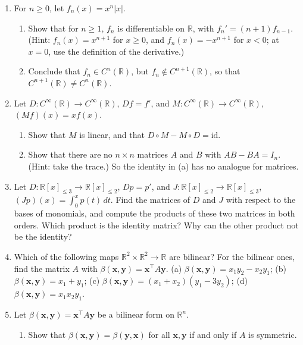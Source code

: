 \begin{enumerate}[leftmargin=*]
	\item\label{L1-ex:Cn-strict} \homework{} For $n \geq 0$, let $f_n(x) = x^n|x|$.
	\begin{enumerate}
		\item Show that for $n \geq 1$, $f_n$ is differentiable on $\mathbb{R}$, with $f_n' = (n + 1)f_{n-1}$. (Hint: $f_n(x) = x^{n+1}$ for $x \geq 0$, and $f_n(x) = -x^{n+1}$ for $x < 0$; at $x = 0$, use the definition of the derivative.)
		\item Conclude that $f_n \in C^n(\mathbb{R})$, but $f_n \notin C^{n+1}(\mathbb{R})$, so that $C^{n+1}(\mathbb{R}) \neq C^n(\mathbb{R})$.
	\end{enumerate}
	\item \homework{} Let $D: C^\infty(\mathbb{R}) \to C^\infty(\mathbb{R})$, $Df = f'$, and $M: C^\infty(\mathbb{R}) \to C^\infty(\mathbb{R})$, $(Mf)(x) = x f(x)$.
	\begin{enumerate}
		\item Show that $M$ is linear, and that $D \circ M - M \circ D = \mathrm{id}$.
		\item Show that there are no $n \times n$ matrices $A$ and $B$ with $AB - BA = I_n$. (Hint: take the trace.) So the identity in (a) has no analogue for matrices.
	\end{enumerate}
	\item \homework{} Let $D: \mathbb{R}[x]_{\leq 3} \to \mathbb{R}[x]_{\leq 2}$, $Dp = p'$, and $J: \mathbb{R}[x]_{\leq 2} \to \mathbb{R}[x]_{\leq 3}$, $(Jp)(x) = \int_0^x p(t)\, dt$. Find the matrices of $D$ and $J$ with respect to the bases of monomials, and compute the products of these two matrices in both orders. Which product is the identity matrix? Why can the other product not be the identity?
	\item Which of the following maps $\mathbb{R}^2 \times \mathbb{R}^2 \to \mathbb{R}$ are bilinear? For the bilinear ones, find the matrix $A$ with $\beta(\mathbf{x}, \mathbf{y}) = \mathbf{x}^\top A\mathbf{y}$. (a) $\beta(\mathbf{x}, \mathbf{y}) = x_1y_2 - x_2y_1$; (b) $\beta(\mathbf{x}, \mathbf{y}) = x_1 + y_1$; (c) $\beta(\mathbf{x}, \mathbf{y}) = (x_1 + x_2)(y_1 - 3y_2)$; (d) $\beta(\mathbf{x}, \mathbf{y}) = x_1x_2y_1$.
	\item Let $\beta(\mathbf{x}, \mathbf{y}) = \mathbf{x}^\top A\mathbf{y}$ be a bilinear form on $\mathbb{R}^n$.
	\begin{enumerate}
		\item Show that $\beta(\mathbf{x}, \mathbf{y}) = \beta(\mathbf{y}, \mathbf{x})$ for all $\mathbf{x}, \mathbf{y}$ if and only if $A$ is symmetric.

\end{enumerate}
\end{enumerate}
